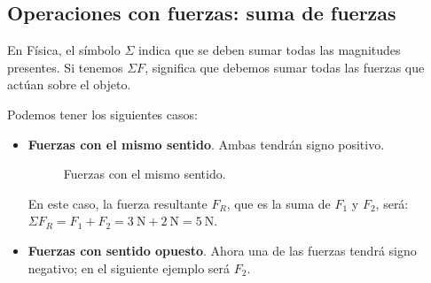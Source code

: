 \subsection{Operaciones con fuerzas: suma de fuerzas}

En Física, el símbolo \( \Sigma \) indica que se deben sumar todas las magnitudes presentes.
Si tenemos \( \Sigma F \), significa que debemos sumar todas las fuerzas que actúan sobre el objeto.

Podemos tener los siguientes casos:

\begin{itemize}
    \item \textbf{Fuerzas con el mismo sentido}.
    Ambas tendrán signo positivo.
    \begin{figure}[H]
        \centering
        \caption{Fuerzas con el mismo sentido.}
    \end{figure}
    En este caso, la fuerza resultante \( F_R \), que es la suma de \( F_1 \) y \( F_2 \), será:
    \( \Sigma F_R = F_1 + F_2 = \qty{3}{\newton} + \qty{2}{\newton} = \qty{5}{\newton} \).

    \item \textbf{Fuerzas con sentido opuesto}.
    Ahora una de las fuerzas tendrá signo negativo; en el siguiente ejemplo será \( F_2 \).
    \begin{figure}[H]
        \centering
\end{figure}
\end{itemize}
